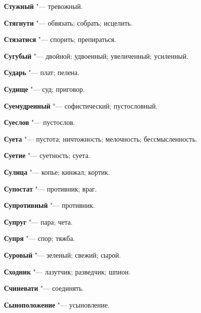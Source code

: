 \begin{mymulticols}{2}
\noindent\textbf{Стужный} "--- тревожный. 




\noindent\textbf{Стягнути} "--- обвязать; собрать; исцелить. 




\noindent\textbf{Стязатися} "--- спорить; препираться. 




\noindent\textbf{Сугубый} "--- двойной; удвоенный; увеличенный; усиленный. 




\noindent\textbf{Сударь} "--- плат; пелена. 




\noindent\textbf{Судище} "--- суд; приговор. 




\noindent\textbf{Суемудренный} "--- софистический; пустословный. 




\noindent\textbf{Суеслов} "--- пустослов. 




\noindent\textbf{Суета} "--- пустота; ничтожность; мелочность; бессмысленность. 




\noindent\textbf{Суетие} "--- суетность; суета. 




\noindent\textbf{Сулица} "--- копье; кинжал; кортик. 




\noindent\textbf{Супостат} "--- противник; враг. 




\noindent\textbf{Супротивный} "--- противник. 




\noindent\textbf{Супруг} "--- пара; чета. 




\noindent\textbf{Супря} "--- спор; тяжба. 




\noindent\textbf{Суровый} "--- зеленый; свежий; сырой. 




\noindent\textbf{Сходник} "--- лазутчик; разведчик; шпион. 




\noindent\textbf{Счиневати} "--- соединять. 




\noindent\textbf{Сыноположение} "--- усыновление. 





\end{mymulticols}
